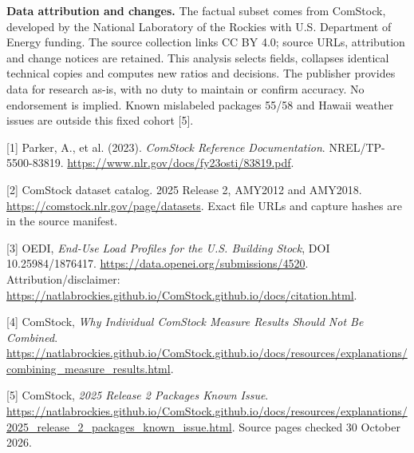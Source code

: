 \documentclass[10pt,letterpaper]{article}
\begin{document}
\textbf{Data attribution and changes.} The factual subset comes from ComStock, developed by the National Laboratory of the Rockies with U.S. Department of Energy funding. The source collection links CC BY 4.0; source URLs, attribution and change notices are retained. This analysis selects fields, collapses identical technical copies and computes new ratios and decisions. The publisher provides data for research as-is, with no duty to maintain or confirm accuracy. No endorsement is implied. Known mislabeled packages 55/58 and Hawaii weather issues are outside this fixed cohort [5].

\small
[1] Parker, A., et al. (2023). \emph{ComStock Reference Documentation}. NREL/TP-5500-83819. \url{https://www.nlr.gov/docs/fy23osti/83819.pdf}.

[2] ComStock dataset catalog. 2025 Release 2, AMY2012 and AMY2018. \url{https://comstock.nlr.gov/page/datasets}. Exact file URLs and capture hashes are in the source manifest.

[3] OEDI, \emph{End-Use Load Profiles for the U.S. Building Stock}, DOI 10.25984/1876417. \url{https://data.openei.org/submissions/4520}. Attribution/disclaimer: \url{https://natlabrockies.github.io/ComStock.github.io/docs/citation.html}.

[4] ComStock, \emph{Why Individual ComStock Measure Results Should Not Be Combined}. \url{https://natlabrockies.github.io/ComStock.github.io/docs/resources/explanations/combining_measure_results.html}.

[5] ComStock, \emph{2025 Release 2 Packages Known Issue}. \url{https://natlabrockies.github.io/ComStock.github.io/docs/resources/explanations/2025_release_2_packages_known_issue.html}. Source pages checked 30 October 2026.
\end{document}
